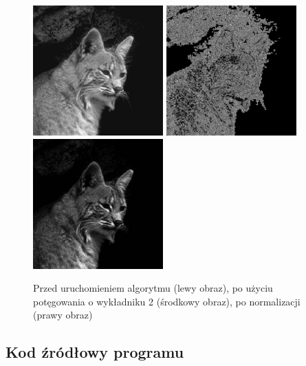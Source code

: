 \documentclass[a4paper,12pt]{book}
\begin{document}
\begin{figure}[H]
\caption{Przed uruchomieniem algorytmu (lewy obraz), po użyciu potęgowania o wykładniku 2 (środkowy obraz), po normalizacji (prawy obraz)}
\includegraphics[width=5cm, height=5cm]{cat-unmodified.jpg}
\includegraphics[width=5cm, height=5cm]{2-4/power-gray-cat-20.png}
\includegraphics[width=5cm, height=5cm]{2-4/power-gray-cat-20-norm.png}
\end{figure}

\subsection*{Kod źródłowy programu}
\end{document}
